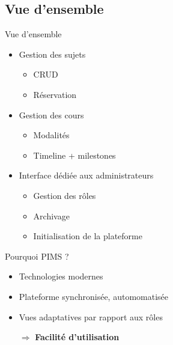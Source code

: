 \documentclass[numbering=fraction,10pt]{beamer}
\begin{document}
\subsection{Vue d'ensemble}

\begin{frame}{Vue d'ensemble}
    \begin{itemize}
        \item Gestion des sujets
        \begin{itemize}
            \item CRUD
            \item Réservation
        \end{itemize} 
        \item Gestion des cours
        \begin{itemize}
            \item Modalités 
            \item Timeline + milestones
        \end{itemize}
        \item Interface dédiée aux administrateurs
        \begin{itemize}
            \item Gestion des rôles
            \item Archivage 
            \item Initialisation de la plateforme
        \end{itemize}
    \end{itemize}
\end{frame}


\begin{frame}{Pourquoi PIMS ?}
    \begin{itemize}
        \item Technologies modernes
        \item Plateforme synchronisée, automomatisée
        \item Vues adaptatives par rapport aux rôles
        \item[$\Longrightarrow$] \textbf{Facilité d'utilisation}
    \end{itemize}
\end{frame}
\end{document}
